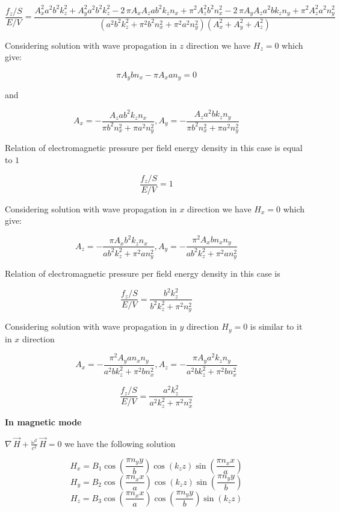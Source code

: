 \documentclass[11pt]{article}
\begin{document}
    \[\frac{f_z/S}{E/V} = \frac{A_{x}^{2} a^{2} b^{2} k_{z}^{2} + A_{y}^{2} a^{2} b^{2} k_{z}^{2} - 2 \, \pi A_{x} A_{z} a b^{2} k_{z} n_{x} + \pi^{2} A_{z}^{2} b^{2} n_{x}^{2} - 2 \, \pi A_{y} A_{z} a^{2} b k_{z} n_{y} + \pi^{2} A_{z}^{2} a^{2} n_{y}^{2}}{{\left(a^{2} b^{2} k_{z}^{2} + \pi^{2} b^{2} n_{x}^{2} + \pi^{2} a^{2} n_{y}^{2}\right)} {\left(A_{x}^{2} + A_{y}^{2} + A_{z}^{2}\right)}}\]

    Considering solution with wave propagation in \(z\) direction we have
\(H_z = 0\) which give:

    \[\pi A_{y} b n_{x} - \pi A_{x} a n_{y} = 0\]

    and

\[A_{x} = -\frac{A_{z} a b^{2} k_{z} n_{x}}{\pi b^{2} n_{x}^{2} + \pi a^{2} n_{y}^{2}},
A_{y} = -\frac{A_{z} a^{2} b k_{z} n_{y}}{\pi b^{2} n_{x}^{2} + \pi a^{2} n_{y}^{2}}\]

    Relation of electromagnetic pressure per field energy density in this
case is equal to \(1\)

\[\frac{f_z/S}{E/V} = 1\]

    Considering solution with wave propagation in \(x\) direction we have
\(H_x = 0\) which give:

    \[A_{z} = -\frac{\pi A_{x} b^{2} k_{z} n_{x}}{a b^{2} k_{z}^{2} + \pi^{2} a n_{y}^{2}},
A_{y} = -\frac{\pi^{2} A_{x} b n_{x} n_{y}}{a b^{2} k_{z}^{2} + \pi^{2} a n_{y}^{2}}\]

    Relation of electromagnetic pressure per field energy density in this
case is

\[\frac{f_z/S}{E/V} = \frac{b^{2} k_{z}^{2}}{b^{2} k_{z}^{2} + \pi^{2} n_{y}^{2}}\]

    Considering solution with wave propagation in \(y\) direction
\(H_y = 0\) is similar to it in \(x\) direction

\[A_{x} = -\frac{\pi^{2} A_{y} a n_{x} n_{y}}{a^{2} b k_{z}^{2} + \pi^{2} b n_{x}^{2}},
A_{z} = -\frac{\pi A_{y} a^{2} k_{z} n_{y}}{a^{2} b k_{z}^{2} + \pi^{2} b n_{x}^{2}}\]

\[\frac{f_z/S}{E/V} = \frac{a^{2} k_{z}^{2}}{a^{2} k_{z}^{2} + \pi^{2} n_{x}^{2}}\]

    \textbf{In magnetic mode}

\(\nabla\,\vec{H} + \frac{\omega^2}{c^2}\,\vec{H} = 0\) we have the
following solution

    \[H_{x} = B_{1} \cos\left(\frac{\pi n_{y} y}{b}\right) \cos\left(k_{z} z\right) \sin\left(\frac{\pi n_{x} x}{a}\right)\]
\[H_{y} = B_{2} \cos\left(\frac{\pi n_{x} x}{a}\right) \cos\left(k_{z} z\right) \sin\left(\frac{\pi n_{y} y}{b}\right)\]
\[H_{z} = B_{3} \cos\left(\frac{\pi n_{x} x}{a}\right) \cos\left(\frac{\pi n_{y} y}{b}\right) \sin\left(k_{z} z\right)\]
\end{document}
